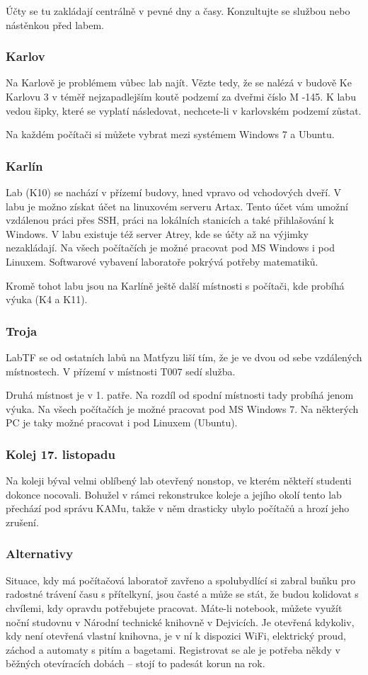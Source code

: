 Účty se tu zakládají centrálně v pevné dny a časy. Konzultujte se službou nebo
nástěnkou před labem.

\subsubsection{Karlov}
Na Karlově je problémem vůbec lab najít. Vězte tedy, že se nalézá v budově Ke
Karlovu 3 v téměř nejzapadlejším koutě podzemí za dveřmi číslo M -145. K labu vedou
šipky, které se vyplatí následovat, nechcete-li v karlovském podzemí zůstat.

Na každém počítači si můžete vybrat mezi systémem Windows 7 a Ubuntu.


\subsubsection{Karlín}
Lab (K10) se nachází v přízemí budovy, hned vpravo od vchodových dveří. V labu
je možno získat účet na linuxovém serveru Artax. Tento účet vám umožní vzdálenou
práci přes SSH, práci na lokálních stanicích a také přihlašování k Windows. V
labu existuje též server Atrey, kde se účty až na výjimky nezakládají. Na všech
počítačích je možné pracovat pod MS Windows i pod Linuxem. Softwarové vybavení
laboratoře pokrývá potřeby matematiků.

Kromě tohot labu jsou na Karlíně ještě další místnosti s počítači, kde probíhá výuka (K4 a K11).


\subsubsection{Troja}
LabTF se od ostatních labů na Matfyzu liší tím, že je ve dvou od sebe vzdálených
místnostech. V přízemí v místnosti T007 sedí služba.

Druhá místnost je v 1. patře. Na rozdíl od spodní místnosti tady probíhá jenom
výuka. Na všech počítačích je možné pracovat pod MS Windows 7. Na některých PC
je taky možné pracovat i pod Linuxem (Ubuntu). 

\subsubsection{Kolej 17. listopadu}
Na koleji býval velmi oblíbený lab otevřený nonstop, ve kterém někteří studenti dokonce nocovali. Bohužel v rámci rekonstrukce koleje a jejího okolí tento lab přechází pod správu KAMu, takže v něm drasticky ubylo počítačů a hrozí jeho zrušení.


\subsubsection{Alternativy}
Situace, kdy má počítačová laboratoř zavřeno a spolubydlící si zabral buňku pro
radostné trávení času s přítelkyní, jsou časté a může se stát, že budou
kolidovat s chvílemi, kdy opravdu potřebujete pracovat. Máte-li notebook, můžete
využít noční studovnu v Národní technické knihovně v Dejvicích. Je otevřená
kdykoliv, kdy není otevřená vlastní knihovna, je v ní k dispozici WiFi,
elektrický proud, záchod a automaty s pitím a bagetami. Registrovat se ale je
potřeba někdy v běžných otevíracích dobách – stojí to padesát korun na rok.

